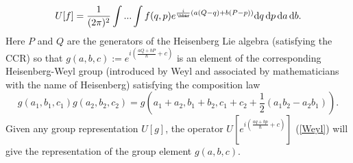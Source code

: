 \documentclass[12pt]{article}
\begin{document}
\begin{equation}
\label{Weyl}
U [f] = \frac{1}{(2\pi)^2}\int ... \int f(q,p) e^{\frac{i}{\hbar}(a(Q-q) +b(P-p))} {\rm d}q\, {\rm d}p\, {\rm d}a\, {\rm d}b. 
\end{equation}
Here $P$ and $Q$ are the generators of the Heisenberg Lie algebra (satisfying the CCR) so that $g(a, b, c):= e^{i(\frac{aQ+bP}{\hbar} + c)}$ 
is an element of the corresponding Heisenberg-Weyl group (introduced by Weyl and associated by mathematicians with the name of Heisenberg)
satisfying the composition law
\begin{equation}
\label{compos}
g(a_1, b_1, c_1) g(a_2, b_2, c_2) = g(a_1 + a_2, b_1 + b_2, c_1 + c_2 + \frac{1}{2}(a_1 b_2 - a_2 b_1)).
\end{equation} 
Given any group representation $U [g]$, the operator $U [e^{i(\frac{aq+bp}{\hbar} + c)}]$ (\ref{Weyl}) will give the representation of the 
group element $g(a, b, c)$. 
\end{document}
